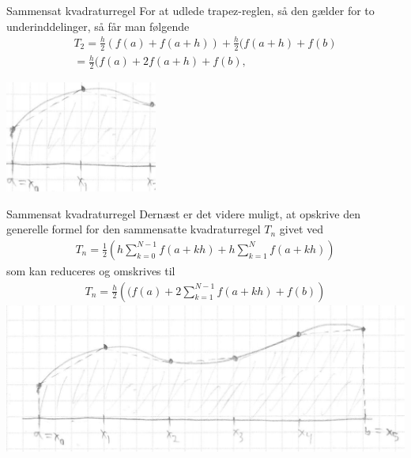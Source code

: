 \begin{frame}{Sammensat kvadraturregel}
    For at udlede trapez-reglen, så den gælder for to underinddelinger, så får man følgende 
    \begin{align*}
    T_2=\frac{h}{2}(f(a)+f(a+h))+\frac{h}{2}(f(a+h)+f(b) \\
    = \frac{h}{2}(f(a)+2f(a+h)+f(b),
    \end{align*}
\begin{center}
\includegraphics[width=50mm]{images/TRAPEZ12.png}
\end{center}
\end{frame}


\begin{frame}{Sammensat kvadraturregel}
Dernæst er det videre muligt, at opskrive den generelle formel for den sammensatte kvadraturregel $T_n$ givet ved
    \begin{align*}
    T_n = \frac{1}{2}\left (  h\sum_{k=0}^{N-1}f(a+kh)+h\sum_{k=1}^{N}f(a+kh)\right )
    \end{align*}
    som kan reduceres og omskrives til 
    \begin{align*}
    T_n =\frac{h}{2}\left ((f(a)+2\sum_{k=1}^{N-1}f(a+kh)+f(b) \right )
    \end{align*}
\includegraphics[scale=0.3]{images/TRAPEZSAM.png}
\end{frame}

